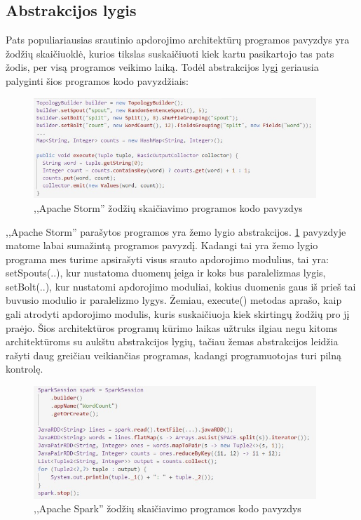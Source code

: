 \documentclass{VUMIFPSkursinis}
\begin{document}
\subsection{Abstrakcijos lygis}
Pats populiariausias srautinio apdorojimo architektūrų programos pavyzdys yra žodžių skaičiuoklė, kurios tikslas suskaičiuoti kiek 
kartu pasikartojo tas pats žodis, per visą programos veikimo laiką. Todėl abstrakcijos lygį geriausia palyginti šios programos kodo pavyzdžiais\cite{petr2016}:

\begin{figure}[!htbp]
    \centering
    \includegraphics[width=0.95\textwidth]{img/StormAPI.jpg}
    \caption{,,Apache Storm'' žodžių skaičiavimo programos kodo pavyzdys}
    \label{fig:stormapi}
\end{figure} \par

,,Apache Storm'' parašytos programos yra žemo lygio abstrakcijos. \ref{fig:stormapi} pavyzdyje matome labai sumažintą programos pavyzdį. 
Kadangi tai yra žemo lygio programa mes turime apsirašyti visus srauto apdorojimo modulius, tai yra: setSpouts(..), kur nustatoma duomenų įeiga ir koks bus paralelizmas lygis, setBolt(..), kur nustatomi apdorojimo moduliai, kokius duomenis gaus iš prieš tai buvusio modulio ir paralelizmo lygys. Žemiau, execute() metodas aprašo, kaip gali atrodyti apdorojimo modulis, kuris suskaičiuoja kiek skirtingų žodžių pro jį praėjo. Šios architektūros programų kūrimo laikas užtruks ilgiau negu kitoms architektūroms su aukštu abstrakcijos lygių, tačiau žemas abstrakcijos leidžia rašyti daug greičiau veikiančias programas, kadangi programuotojas turi pilną kontrolę.


\begin{figure}[!htbp]
    \centering
    \includegraphics[width=0.95\textwidth]{img/SparkAPI.jpg}
    \caption{,,Apache Spark'' žodžių skaičiavimo programos kodo pavyzdys}
    \label{fig:sparkapi}
\end{figure} \par
\end{document}
